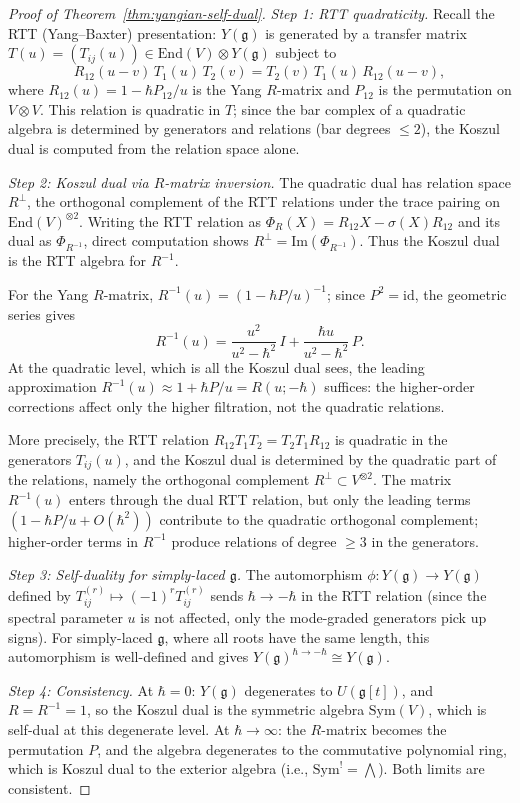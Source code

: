 \begin{proof}[Proof of Theorem~\ref{thm:yangian-self-dual}]
\emph{Step 1: RTT quadraticity.}
Recall the RTT (Yang--Baxter) presentation: $Y(\mathfrak{g})$ is generated by a transfer matrix $T(u) = (T_{ij}(u)) \in \mathrm{End}(V) \otimes Y(\mathfrak{g})$ subject to
\[
R_{12}(u-v)\, T_1(u)\, T_2(v)
= T_2(v)\, T_1(u)\, R_{12}(u-v),
\]
where $R_{12}(u) = 1 - \hbar P_{12}/u$ is the Yang $R$-matrix and $P_{12}$ is the permutation on $V \otimes V$.  This relation is quadratic in $T$; since the bar complex of a quadratic algebra is determined by generators and relations (bar degrees $\leq 2$), the Koszul dual is computed from the relation space alone.

\emph{Step 2: Koszul dual via $R$-matrix inversion.}
The quadratic dual has relation space $R^\perp$, the orthogonal
complement of the RTT relations under the trace pairing on
$\mathrm{End}(V)^{\otimes 2}$.  Writing the RTT relation as
$\Phi_R(X) = R_{12} X - \sigma(X) R_{12}$ and its dual as
$\Phi_{R^{-1}}$, direct computation shows
$R^\perp = \mathrm{Im}(\Phi_{R^{-1}})$.  Thus the Koszul dual is the
RTT algebra for $R^{-1}$.

For the Yang $R$-matrix, $R^{-1}(u) = (1 - \hbar P/u)^{-1}$; since
$P^2 = \mathrm{id}$, the geometric series gives
\[
R^{-1}(u) = \frac{u^2}{u^2 - \hbar^2}\,I
  + \frac{\hbar u}{u^2 - \hbar^2}\,P.
\]
At the quadratic level, which is all the Koszul dual sees, the leading
approximation $R^{-1}(u) \approx 1 + \hbar P/u = R(u; -\hbar)$
suffices: the higher-order corrections affect only the higher
filtration, not the quadratic relations.

More precisely, the RTT relation
$R_{12}T_1T_2 = T_2T_1R_{12}$ is quadratic in the generators
$T_{ij}(u)$, and the Koszul dual is determined by the quadratic part of
the relations, namely the orthogonal complement
$R^\perp \subset V^{\otimes 2}$.  The matrix $R^{-1}(u)$ enters through
the dual RTT relation, but only the leading terms
$(1 - \hbar P/u + O(\hbar^2))$ contribute to the quadratic orthogonal
complement; higher-order terms in $R^{-1}$ produce relations of degree
$\geq 3$ in the generators.

\emph{Step 3: Self-duality for simply-laced $\mathfrak{g}$.}
The automorphism $\phi\colon Y(\mathfrak{g}) \to Y(\mathfrak{g})$ defined by $T_{ij}^{(r)} \mapsto (-1)^r T_{ij}^{(r)}$ sends $\hbar \to -\hbar$ in the RTT relation (since the spectral parameter $u$ is not affected, only the mode-graded generators pick up signs).  For simply-laced $\mathfrak{g}$, where all roots have the same length, this automorphism is well-defined and gives $Y(\mathfrak{g})^{\hbar \to -\hbar} \cong Y(\mathfrak{g})$.

\emph{Step 4: Consistency.}
At $\hbar = 0$: $Y(\mathfrak{g})$ degenerates to $U(\mathfrak{g}[t])$, and $R = R^{-1} = 1$, so the Koszul dual is the symmetric algebra $\mathrm{Sym}(V)$, which is self-dual at this degenerate level.  At $\hbar \to \infty$: the $R$-matrix becomes the permutation $P$, and the algebra degenerates to the commutative polynomial ring, which is Koszul dual to the exterior algebra (i.e., $\mathrm{Sym}^! = \bigwedge$).  Both limits are consistent.
\end{proof}

